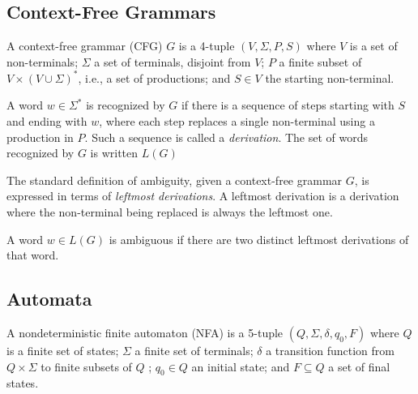\documentclass[runningheads]{llncs}
\newcommand{\NT}{V} %
\newcommand{\T}{\Sigma} %
\newcommand{\regex}{\mathit{Reg}}
\begin{document}

\subsection{Context-Free Grammars} \label{sec:preliminaries-cfgs}

A context-free grammar (CFG) $G$ is a 4-tuple $(\NT, \T, P, S)$ where $\NT$ is a set of non-terminals; $\T$ a set of terminals, disjoint from $\NT$; $P$ a finite subset of $\NT \times (\NT \cup \T)^{*}$, i.e., a set of productions; and $S \in \NT$ the starting non-terminal.

%
A word $w \in \T^{*}$ is recognized by $G$ if there is a sequence of steps starting with $S$ and ending with $w$, where each step replaces a single non-terminal using a production in $P$. Such a sequence is called a \emph{derivation}. The set of words recognized by $G$ is written $L(G)$


The standard definition of ambiguity, given a context-free grammar $G$, is expressed in terms of \emph{leftmost derivations}. A leftmost derivation is a derivation where the non-terminal being replaced is always the leftmost one.

\begin{definition}
A word $w \in L(G)$ is ambiguous if there are two distinct leftmost derivations of that word.
\end{definition}

\subsection{Automata} \label{sec:preliminaries-automata}

A nondeterministic finite automaton (NFA) is a 5-tuple $(Q, \T, \delta, q_0, F)$ where $Q$ is a finite set of states; $\T$ a finite set of terminals; $\delta$ a transition function from $Q \times \T$ to finite subsets of $Q$ ; $q_0 \in Q$ an initial state; and $F \subseteq Q$ a set of final states.
\end{document}
